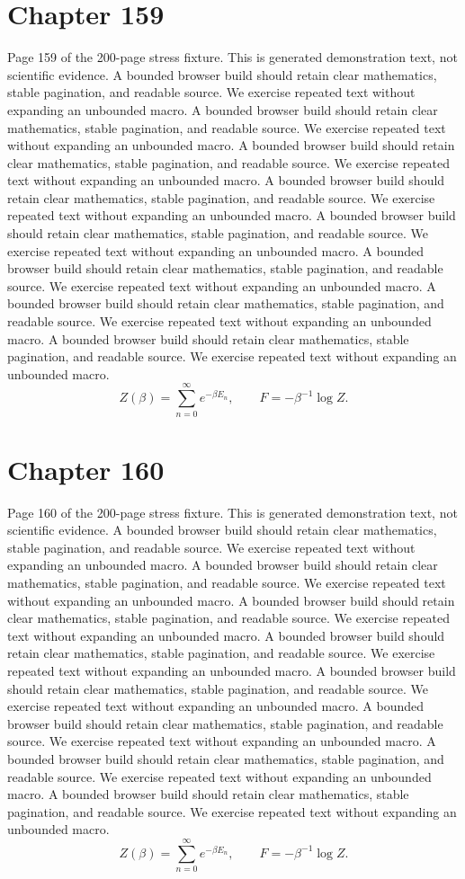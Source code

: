 \documentclass[11pt]{article}
\begin{document}
\section*{Chapter 159}
Page 159 of the 200-page stress fixture. This is generated demonstration text, not scientific evidence.
A bounded browser build should retain clear mathematics, stable pagination, and readable source. We exercise repeated text without expanding an unbounded macro.
A bounded browser build should retain clear mathematics, stable pagination, and readable source. We exercise repeated text without expanding an unbounded macro.
A bounded browser build should retain clear mathematics, stable pagination, and readable source. We exercise repeated text without expanding an unbounded macro.
A bounded browser build should retain clear mathematics, stable pagination, and readable source. We exercise repeated text without expanding an unbounded macro.
A bounded browser build should retain clear mathematics, stable pagination, and readable source. We exercise repeated text without expanding an unbounded macro.
A bounded browser build should retain clear mathematics, stable pagination, and readable source. We exercise repeated text without expanding an unbounded macro.
A bounded browser build should retain clear mathematics, stable pagination, and readable source. We exercise repeated text without expanding an unbounded macro.
A bounded browser build should retain clear mathematics, stable pagination, and readable source. We exercise repeated text without expanding an unbounded macro.
\[Z(\beta)=\sum_{n=0}^{\infty}e^{-\beta E_n},\qquad F=-\beta^{-1}\log Z.\]
\newpage
\section*{Chapter 160}
Page 160 of the 200-page stress fixture. This is generated demonstration text, not scientific evidence.
A bounded browser build should retain clear mathematics, stable pagination, and readable source. We exercise repeated text without expanding an unbounded macro.
A bounded browser build should retain clear mathematics, stable pagination, and readable source. We exercise repeated text without expanding an unbounded macro.
A bounded browser build should retain clear mathematics, stable pagination, and readable source. We exercise repeated text without expanding an unbounded macro.
A bounded browser build should retain clear mathematics, stable pagination, and readable source. We exercise repeated text without expanding an unbounded macro.
A bounded browser build should retain clear mathematics, stable pagination, and readable source. We exercise repeated text without expanding an unbounded macro.
A bounded browser build should retain clear mathematics, stable pagination, and readable source. We exercise repeated text without expanding an unbounded macro.
A bounded browser build should retain clear mathematics, stable pagination, and readable source. We exercise repeated text without expanding an unbounded macro.
A bounded browser build should retain clear mathematics, stable pagination, and readable source. We exercise repeated text without expanding an unbounded macro.
\[Z(\beta)=\sum_{n=0}^{\infty}e^{-\beta E_n},\qquad F=-\beta^{-1}\log Z.\]
\newpage
\end{document}
